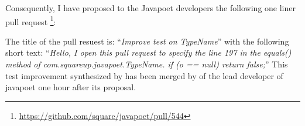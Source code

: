Consequently, I have proposed to the Javapoet developers the following one liner pull request \footnote{\url{https://github.com/square/javapoet/pull/544}}:
\begin{figure}[H]
	\centering
\end{figure}
The title of the pull resuest is: ``\emph{Improve test on TypeName}'' with the following short text: ``\emph{Hello, I open this pull request to specify the line 197 in the equals() method of com.squareup.javapoet.TypeName. if (o == null) return false;}''
This test improvement synthesized by \dspot has been merged by of the lead developer of javapoet one hour after its proposal.


